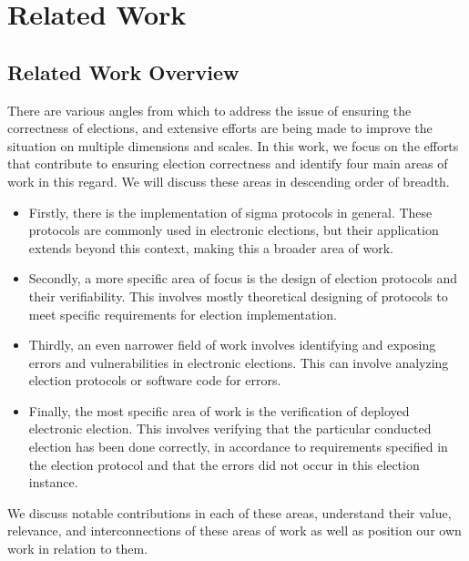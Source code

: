 \chapter{Related Work}\label{chap:relatedWork}
\section{Related Work Overview} 
There are various angles from which to address the issue of ensuring the correctness of elections, and extensive efforts are being made to improve the situation on multiple dimensions and scales. In this work, we focus on the efforts that contribute to ensuring election correctness and identify four main areas of work in this regard. We will discuss these areas in descending order of breadth.
\begin{itemize}
    \item Firstly, there is the implementation of sigma protocols in general. These protocols are commonly used in electronic elections, but their application extends beyond this context, making this a broader area of work.
    \item Secondly, a more specific area of focus is the design of election protocols and their verifiability. This involves mostly theoretical designing of protocols to meet specific requirements for election implementation.
    \item Thirdly, an even narrower field of work involves identifying and exposing errors and vulnerabilities in electronic elections. This can involve analyzing election protocols or software code for errors.
    \item Finally, the most specific area of work is the verification of deployed electronic election. This involves verifying that the particular conducted election has been done correctly, in accordance to requirements specified in the election protocol and that the errors did not occur in this election instance.
\end{itemize}

We discuss notable contributions in each of these areas, understand their value, relevance, and interconnections of these areas of work as well as position our own work in relation to them.


